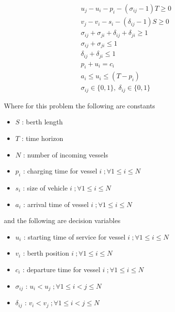 \documentclass[letterpaper, 10pt, conference]{IEEEtran}
\begin{document}
\begin{subequations}
\label{eq:bapconstrs}
\begin{align}
    u_j - u_i - p_i - (\sigma_{ij} - 1)T \geq 0                     \label{subeq:baptime}         \\
    v_j - v_i - s_i - (\delta_{ij} - 1)S \geq 0                     \label{subeq:bapspace}        \\
    \sigma_{ij} + \sigma_{ji} + \delta_{ij} + \delta_{ji} \geq 1    \label{subeq:bapvalid_pos}    \\
    \sigma_{ij} + \sigma_{ji} \leq 1                                \label{subeq:bapsigma}        \\
    \delta_{ij} + \delta_{ji} \leq 1                                \label{subeq:bapdelta}        \\
    p_i + u_i = c_i                                                 \label{subeq:bapdetach}       \\
    a_i \leq u_i \leq (T - p_i)                                     \label{subeq:bapvalid_starts} \\
    \sigma_{ij} \in \{0,1\},\;\delta_{ij} \in \{0,1\}               \label{subeq:sdspace}
\end{align}
\end{subequations}

\noindent
Where for this problem the following are constants

\begin{itemize}
	\item \(S\)   : berth length
	\item \(T\)   : time horizon
	\item \(N\)   : number of incoming vessels
	\item \(p_i\) : charging time for vessel \(i\;; \forall 1 \leq i \leq N\)
	\item \(s_i\) : size of vehicle \(i\;; \forall 1 \leq i \leq N\)
	\item \(a_i\) : arrival time of vessel \(i\;; \forall 1 \leq i \leq N\)
\end{itemize}

\noindent
and the following are decision variables

\begin{itemize}
    \item \(u_i\)         : starting time of service for vessel \(i\;; \forall 1 \leq i \leq N\)
    \item \(v_i\)         : berth position \(i\;; \forall 1 \leq i \leq N\)
    \item \(c_i\)         : departure time for vessel \(i\;; \forall 1 \leq i \leq N\)
    \item \(\sigma_{ij}\) : \(u_i < u_j\;; \forall 1 \leq i < j \leq N\)
    \item \(\delta_{ij}\) : \(v_i < v_j\;; \forall 1 \leq i < j \leq N\)
\end{itemize}
\end{document}
